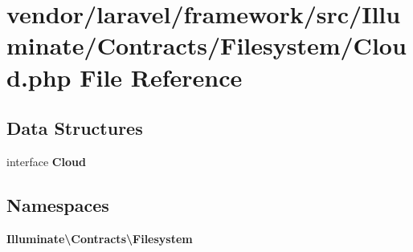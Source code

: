 \section{vendor/laravel/framework/src/\+Illuminate/\+Contracts/\+Filesystem/\+Cloud.php File Reference}
\label{_cloud_8php}
\subsection*{Data Structures}
\begin{DoxyCompactItemize}
\item 
interface {\bf Cloud}
\end{DoxyCompactItemize}
\subsection*{Namespaces}
\begin{DoxyCompactItemize}
\item 
 {\bf Illuminate\textbackslash{}\+Contracts\textbackslash{}\+Filesystem}
\end{DoxyCompactItemize}
